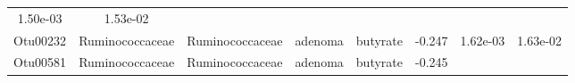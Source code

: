 \documentclass[11pt,]{article}
\begin{document}
\begin{longtable}[]{@{}cccccccc@{}}
\begin{minipage}[t]{0.08\columnwidth}
1.50e-03\strut
\end{minipage} & \begin{minipage}[t]{0.08\columnwidth}\centering\strut
1.53e-02\strut
\end{minipage}\tabularnewline
\begin{minipage}[t]{0.08\columnwidth}\centering\strut
Otu00232\strut
\end{minipage} & \begin{minipage}[t]{0.15\columnwidth}\centering\strut
Ruminococcaceae\strut
\end{minipage} & \begin{minipage}[t]{0.15\columnwidth}\centering\strut
Ruminococcaceae\strut
\end{minipage} & \begin{minipage}[t]{0.08\columnwidth}\centering\strut
adenoma\strut
\end{minipage} & \begin{minipage}[t]{0.09\columnwidth}\centering\strut
butyrate\strut
\end{minipage} & \begin{minipage}[t]{0.07\columnwidth}\centering\strut
-0.247\strut
\end{minipage} & \begin{minipage}[t]{0.08\columnwidth}\centering\strut
1.62e-03\strut
\end{minipage} & \begin{minipage}[t]{0.08\columnwidth}\centering\strut
1.63e-02\strut
\end{minipage}\tabularnewline
\begin{minipage}[t]{0.08\columnwidth}\centering\strut
Otu00581\strut
\end{minipage} & \begin{minipage}[t]{0.15\columnwidth}\centering\strut
Ruminococcaceae\strut
\end{minipage} & \begin{minipage}[t]{0.15\columnwidth}\centering\strut
Ruminococcaceae\strut
\end{minipage} & \begin{minipage}[t]{0.08\columnwidth}\centering\strut
adenoma\strut
\end{minipage} & \begin{minipage}[t]{0.09\columnwidth}\centering\strut
butyrate\strut
\end{minipage} & \begin{minipage}[t]{0.07\columnwidth}\centering\strut
-0.245\strut
\end{minipage} & \begin{minipage}[t]{0.08\columnwidth}\centering\strut

\end{minipage}
\end{longtable}
\end{document}
